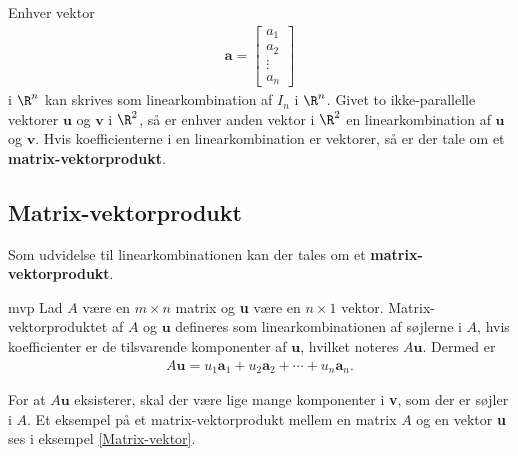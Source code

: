 %
%
Enhver vektor 
\begin{align*}
\textbf{a}=
\begin{bmatrix}
a_1 \\
a_2 \\
\vdots \\
a_n
\end{bmatrix}
\end{align*}
%
i $\R^n$ kan skrives som linearkombination af $I_n$ i $\R^n$. 
Givet to ikke-parallelle vektorer $\mathbf{u}$ og $\mathbf{v}$ i $\R^2$, så er enhver anden vektor i $\R^2$ en linearkombination af $\mathbf{u}$ og $\mathbf{v}$. 
Hvis koefficienterne i en linearkombination er vektorer, så er der tale om et \textbf{matrix-vektorprodukt}.
%
%
%
%
\subsection{Matrix-vektorprodukt}
%
Som udvidelse til linearkombinationen kan der tales om et \textbf{matrix-vektorprodukt}.
%
%
\begin{defn}{}{mvp}
Lad $A$ være en $m \times n$ matrix og \textbf{u} være en $n \times 1$ vektor. 
Matrix-vektorproduktet af $A$ og $\textbf{u}$ defineres som linearkombinationen af søjlerne i $A$, hvis koefficienter er de tilsvarende komponenter af $\textbf{u}$, hvilket noteres $A\textbf{u}$. 
Dermed er
\begin{align*}
A\textbf{u} =u_1\textbf{a}_1 + u_2\textbf{a}_2 + \cdots + u_n\textbf{a}_n.
\end{align*}
\end{defn}
\noindent
For at $A\textbf{u}$ eksisterer, skal der være lige mange komponenter i \textbf{v}, som der er søjler i $A$. 
Et eksempel på et matrix-vektorprodukt mellem en matrix $A$ og en vektor \textbf{u} ses i eksempel \ref{Matrix-vektor}.
\\
%
